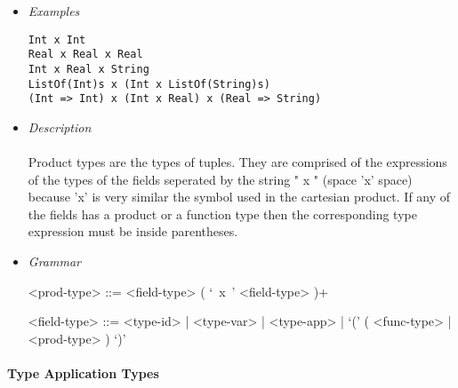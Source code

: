 \documentclass{article}
\begin{document}
\begin{itemize}
\item \textit{Examples}
\begin{verbatim}
Int x Int
Real x Real x Real
Int x Real x String
ListOf(Int)s x (Int x ListOf(String)s)
(Int => Int) x (Int x Real) x (Real => String)
\end{verbatim}

\item \textit{Description} \\\\
Product types are the types of tuples. They are comprised of the expressions of
the types of the fields seperated by the string " x " (space 'x' space) because
'x' is very similar the symbol used in the cartesian product. If any of the
fields has a product or a function type then the corresponding type expression
must be inside parentheses.
\item \textit{Grammar}
\begin{grammar}
<prod-type> ::= <field-type> ( `\ x\ ' <field-type> )+

<field-type> ::=
<type-id> | <type-var> | <type-app> | `(' ( <func-type> | <prod-type> ) `)'
\end{grammar}
\end{itemize}

\paragraph{Type Application Types}
\end{document}
